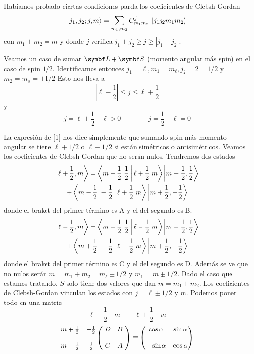 \documentclass[10pt,oneside]{CBFT_book}
\begin{document}
Habíamos probado ciertas condiciones parda los coeficientes de Clebsh-Gordan
\[
	\Ket{j_1,j_2;j,m} = \sum_{m_1,m_2} C_{m_1 m_2}^{j} \: \Ket{ j_1 j_2 m_1 m_2 }
\]
con $m_1 + m_2 = m$ y donde $j$ verifica $ j_1 + j_2 \geq j \geq | j_1 - j_2 |$.

Veamos un caso de sumar $\vb L + \vb S$ (momento angular más spin) en el caso de spin $1/2$.
Identificamos entonces $j_1 = \ell, m_1 = m_\ell, j_2 = 2 = 1/2$ y $m_2 = m_s = \pm 1/2$ 
Esto nos lleva a
\[
	|\ell - \frac 1 2 | \leq j \leq \ell + \frac 1 2
\]
y
\[
	j = \ell \pm \frac{1}{2} \quad \ell > 0 \qquad \qquad j = \frac 1 2 \quad \ell = 0
\]

La expresión de [1] nos dice simplemente que sumando spin más momento angular se tiene $\ell+1/2$ 
o $\ell - 1/2$ si están simétricos o antisimétricos. Veamos los coeficientes de Clebsh-Gordan que
no serán nulos,
Tendremos dos estados
\begin{multline*}
	\Ket{\ell + \frac 1 2, m } =
	\Braket{ m - \frac 1 2 \; \frac 1 2 | \ell + \frac 1 2 \; m } 
	\Ket{ m - \frac 1 2, \frac 1 2 } \\
	+
	\Braket{ m - \frac 1 2 \; -\frac 1 2 | \ell + \frac 1 2 \; m }
	\Ket{ m + \frac 1 2, -\frac 1 2 }
\end{multline*}
donde el braket del primer término es A y el del segundo es B.
\begin{multline*}
	\Ket{\ell - \frac 1 2, m } =
	\Braket{ m - \frac 1 2 \; \frac 1 2 | \ell - \frac 1 2 \; m } 
	\Ket{ m - \frac 1 2, \frac 1 2 } \\
	+
	\Braket{ m + \frac 1 2 \; -\frac 1 2 | \ell - \frac 1 2 \; m }
	\Ket{ m + \frac 1 2, -\frac 1 2 }
\end{multline*}
donde el braket del primer término es C y el del segundo es D.
Además se ve que no nulos serán $ m = m_1 + m_2 = m_\ell \pm 1/2 $ y  $m_1 = m \pm 1/2$.
Dado el caso que estamos tratando, $S$ solo tiene dos valores que dan $ m = m_1 + m_2 $. Los
coeficientes de Clebsh-Gordan vinculan los estados con $j = \ell \pm 1/2$ y $m$. Podemos poner
todo en una matriz
\[
	\ell - \frac{1}{2} \quad m \qquad \ell + \frac{1}{2} \quad m
\]
\[
	\begin{matrix} 
	m + \frac 1 2 & -\frac 1 2 \\
	\\
	m - \frac 1 2 & \frac 1 2
	\end{matrix}
	\begin{pmatrix}
		\; D & B \; \\
		\\
		\; C & A \;
	\end{pmatrix} 
	\equiv
	\begin{pmatrix}
		\cos\alpha & \sin\alpha \\
		\\
		-\sin\alpha & \cos\alpha
	\end{pmatrix}
\]
\end{document}
